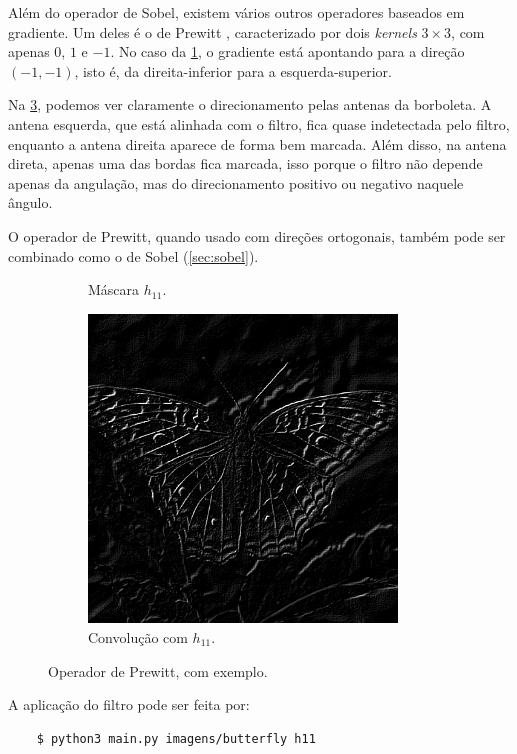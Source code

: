 Além do operador de Sobel, existem vários outros operadores baseados em gradiente. Um deles é o de Prewitt \autocite{ref:prewitt}, caracterizado por dois \textit{kernels} $3 \times 3$, com apenas $0$, $1$ e $-1$. No caso da \cref{fig:h11}, o gradiente está apontando para a direção $(-1, -1)$, isto é, da direita-inferior para a esquerda-superior.

Na \cref{fig:grad}, podemos ver claramente o direcionamento pelas antenas da borboleta. A antena esquerda, que está alinhada com o filtro, fica quase indetectada pelo filtro, enquanto a antena direita aparece de forma bem marcada. Além disso, na antena direta, apenas uma das bordas fica marcada, isso porque o filtro não depende apenas da angulação, mas do direcionamento positivo ou negativo naquele ângulo.

O operador de Prewitt, quando usado com direções ortogonais, também pode ser combinado como o de Sobel (\cref{sec:sobel}).

\begin{figure}[H]
    \centering
    \begin{subfigure}{0.48\textwidth}
        \centering
        

        \caption{Máscara $h_{11}$.}
        \label{fig:h11}
    \end{subfigure}%
    \begin{subfigure}{0.48\textwidth}
        \centering
        \includegraphics[width=0.9\textwidth]{resultados/butterfly_h11.png}
        \caption{Convolução com $h_{11}$.}
        \label{fig:grad}
    \end{subfigure}

    \caption{Operador de Prewitt, com exemplo.}
\end{figure}

A aplicação do filtro pode ser feita por:

\begin{verbatim}
    $ python3 main.py imagens/butterfly h11
\end{verbatim}
